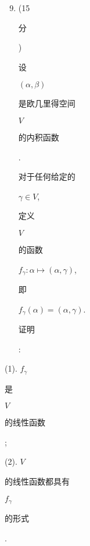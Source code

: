 \documentclass[10pt]{article}
\begin{document}
\begin{enumerate}
  \setcounter{enumi}{8}
  \item (15 \begin{CJK}{UTF8}{mj}分\end{CJK}) \begin{CJK}{UTF8}{mj}设\end{CJK} $(\alpha, \beta)$ \begin{CJK}{UTF8}{mj}是欧几里得空间\end{CJK} $V$ \begin{CJK}{UTF8}{mj}的内积函数\end{CJK}. \begin{CJK}{UTF8}{mj}对于任何给定的\end{CJK} $\gamma \in V$, \begin{CJK}{UTF8}{mj}定义\end{CJK} $V$ \begin{CJK}{UTF8}{mj}的函数\end{CJK} $f_{\gamma}: \alpha \mapsto(\alpha, \gamma)$, \begin{CJK}{UTF8}{mj}即\end{CJK} $f_{\gamma}(\alpha)=(\alpha, \gamma)$. \begin{CJK}{UTF8}{mj}证明\end{CJK}:
\end{enumerate}
(1). $f_{\gamma}$ \begin{CJK}{UTF8}{mj}是\end{CJK} $V$ \begin{CJK}{UTF8}{mj}的线性函数\end{CJK};

(2). $V$ \begin{CJK}{UTF8}{mj}的线性函数都具有\end{CJK} $f_{\gamma}$ \begin{CJK}{UTF8}{mj}的形式\end{CJK}.
\end{document}
